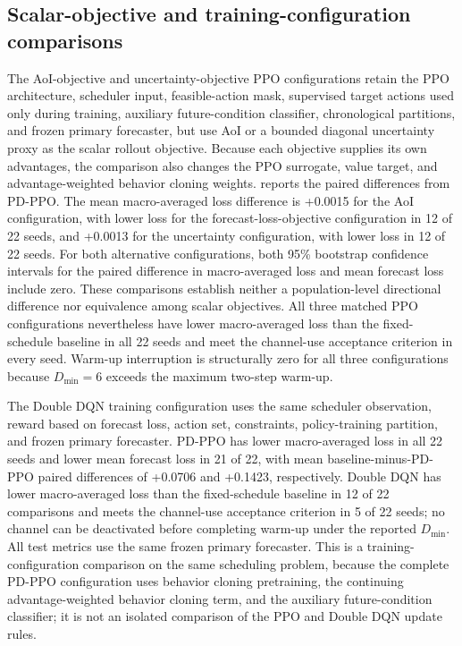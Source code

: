\subsection{Scalar-objective and training-configuration comparisons}
\label{sec:objective_learner_controls}

The AoI-objective and uncertainty-objective PPO configurations retain the PPO
architecture, scheduler input, feasible-action mask, supervised target actions
used only during training, auxiliary future-condition classifier, chronological
partitions, and frozen primary forecaster, but use AoI or a bounded diagonal
uncertainty proxy as the scalar rollout objective. Because each objective supplies its own advantages,
the comparison also changes the PPO surrogate, value target, and
advantage-weighted behavior cloning weights. 
reports the paired differences from PD-PPO. The mean macro-averaged loss
difference is +0.0015 for the AoI configuration, with lower loss for the
forecast-loss-objective configuration in 12 of 22 seeds, and +0.0013 for the
uncertainty configuration, with lower loss in 12 of 22 seeds. For both
alternative configurations, both 95\% bootstrap confidence intervals for the
paired difference in macro-averaged loss and mean forecast loss include zero.
These comparisons establish neither a population-level directional difference
nor equivalence among scalar objectives. All three matched PPO configurations
nevertheless have lower macro-averaged loss than the fixed-schedule baseline in
all 22 seeds and meet the channel-use acceptance criterion in every seed.
Warm-up interruption is structurally zero for all
three configurations because $D_{\min}=6$ exceeds the maximum two-step warm-up.

The Double DQN training configuration uses the same scheduler observation,
reward based on forecast loss, action set, constraints, policy-training partition, and frozen primary
forecaster. PD-PPO has lower
macro-averaged loss in all 22 seeds and lower mean forecast loss in 21 of 22,
with mean baseline-minus-PD-PPO paired differences of +0.0706 and +0.1423,
respectively. Double DQN has lower macro-averaged loss than the fixed-schedule baseline
in 12 of 22 comparisons and meets the channel-use acceptance criterion
in 5 of 22 seeds; no channel can be deactivated before completing warm-up under
the reported $D_{\min}$. All test metrics use the same frozen primary forecaster.
This is a training-configuration comparison on the same scheduling problem,
because the complete PD-PPO configuration uses behavior cloning pretraining,
the continuing advantage-weighted behavior cloning term, and the auxiliary
future-condition classifier; it is not an isolated comparison of
the PPO and Double DQN update rules.

